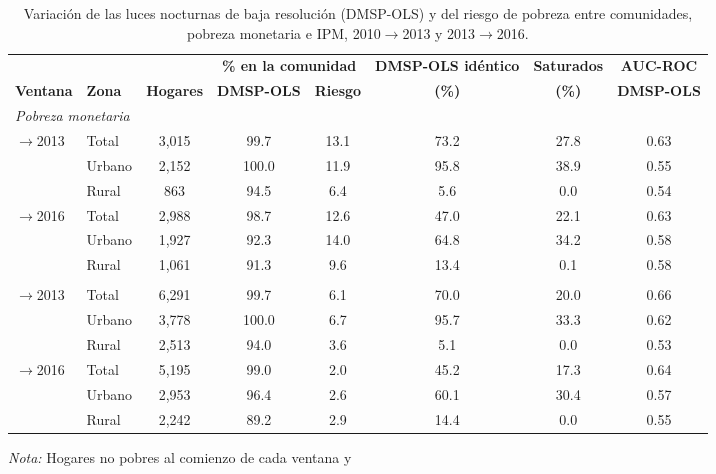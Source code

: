 \begin{table}[H]
  \centering
  \caption{Variación de las luces nocturnas de baja resolución (DMSP-OLS) y del riesgo de pobreza entre
  comunidades, pobreza monetaria e IPM, 2010$\to$2013 y 2013$\to$2016.}
  \label{tab:variacion_dmsp_comunidad}
  \footnotesize
  \setlength{\tabcolsep}{4pt}
  \begin{tabular}{ll c cc cc c}
    \toprule
    & & & \multicolumn{2}{c}{\textbf{\% en la comunidad}} & \textbf{DMSP-OLS idéntico} & \textbf{Saturados} & \textbf{AUC-ROC} \\
    \cmidrule(lr){4-5}
    \textbf{Ventana} & \textbf{Zona} & \textbf{Hogares} & \textbf{DMSP-OLS} & \textbf{Riesgo} & \textbf{(\%)} & \textbf{(\%)} & \textbf{DMSP-OLS} \\
    \midrule
    \multicolumn{8}{l}{\textit{Pobreza monetaria}} \\
    \quad 2010$\to$2013 & Total & 3{,}015 & 99.7 & 13.1 & 73.2 & 27.8 & 0.63 \\
    \quad  & Urbano & 2{,}152 & 100.0 & 11.9 & 95.8 & 38.9 & 0.55 \\
    \quad  & Rural & 863 & 94.5 & 6.4 & 5.6 & 0.0 & 0.54 \\
    \quad 2013$\to$2016 & Total & 2{,}988 & 98.7 & 12.6 & 47.0 & 22.1 & 0.63 \\
    \quad  & Urbano & 1{,}927 & 92.3 & 14.0 & 64.8 & 34.2 & 0.58 \\
    \quad  & Rural & 1{,}061 & 91.3 & 9.6 & 13.4 & 0.1 & 0.58 \\
    \addlinespace
    \multicolumn{8}{l}{\textit{Pobreza multidimensional (IPM)}} \\
    \quad 2010$\to$2013 & Total & 6{,}291 & 99.7 & 6.1 & 70.0 & 20.0 & 0.66 \\
    \quad  & Urbano & 3{,}778 & 100.0 & 6.7 & 95.7 & 33.3 & 0.62 \\
    \quad  & Rural & 2{,}513 & 94.0 & 3.6 & 5.1 & 0.0 & 0.53 \\
    \quad 2013$\to$2016 & Total & 5{,}195 & 99.0 & 2.0 & 45.2 & 17.3 & 0.64 \\
    \quad  & Urbano & 2{,}953 & 96.4 & 2.6 & 60.1 & 30.4 & 0.57 \\
    \quad  & Rural & 2{,}242 & 89.2 & 2.9 & 14.4 & 0.0 & 0.55 \\
    \bottomrule
  \end{tabular}
  \begin{minipage}{0.95\textwidth}
    \vspace{4pt}
    \footnotesize \textit{Nota:} Hogares no pobres al comienzo de cada ventana y

\end{minipage}
\end{table}
